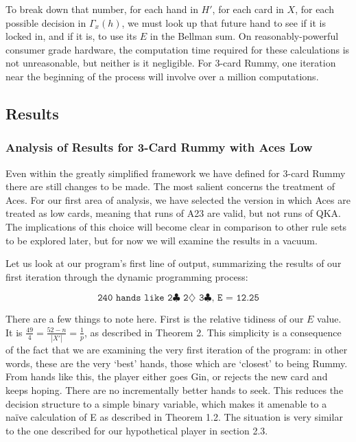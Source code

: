 \documentclass[letter,12pt]{article}
\begin{document}
To break down that number, for each hand in $H'$, for each card in $X$, for each possible decision in $\Gamma_x(h)$, we must look up that future hand to see if it is locked in, and if it is, to use its $E$ in the Bellman sum. On reasonably-powerful consumer grade hardware, the computation time required for these calculations is not unreasonable, but neither is it negligible. For 3-card Rummy, one iteration near the beginning of the process will involve over a million computations.

\subsection{Results}

\subsubsection{Analysis of Results for 3-Card Rummy with Aces Low}

Even within the greatly simplified framework we have defined for 3-card Rummy there are still changes to be made. The most salient concerns the treatment of Aces. For our first area of analysis, we have selected the version in which Aces are treated as low cards, meaning that runs of A23 are valid, but not runs of QKA. The implications of this choice will become clear in comparison to other rule sets to be explored later, but for now we will examine the results in a vacuum.

Let us look at our program’s first line of output, summarizing the results of our first iteration through the dynamic programming process: 

$$\texttt{240 hands like 2$\clubsuit$ 2$\diamondsuit$ 3$\clubsuit$, E = 12.25}$$ 

There are a few things to note here. First is the relative tidiness of our $E$ value. It is $\frac{49}{4} = \frac{52-n}{|X'|} = \frac{1}{p}$, as described in Theorem 2. This simplicity is a consequence of the fact that we are examining the very first iteration of the program: in other words, these are the very ‘best’ hands, those which are ‘closest’ to being Rummy. From hands like this, the player either goes Gin, or rejects the new card and keeps hoping. There are no incrementally better hands to seek. This reduces the decision structure to a simple binary variable, which makes it amenable to a naïve calculation of E as described in Theorem 1.2. The situation is very similar to the one described for our hypothetical player in section 2.3. 
\end{document}
